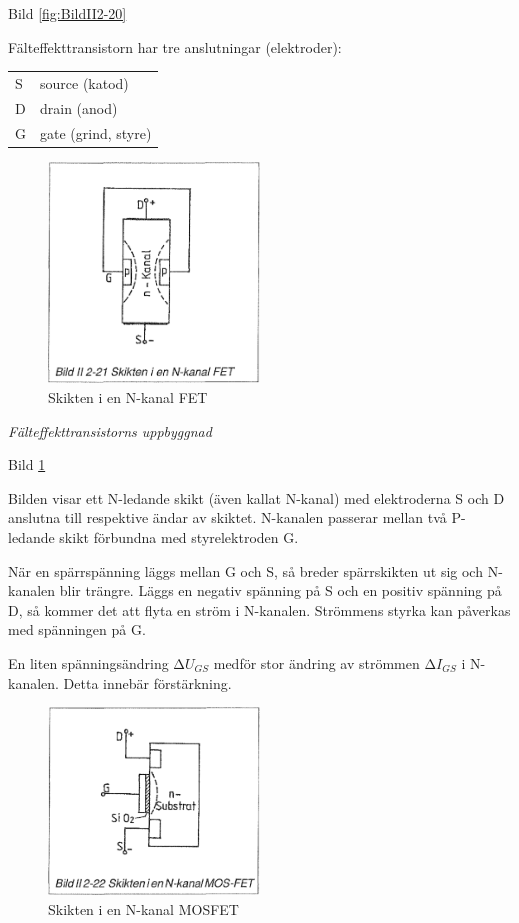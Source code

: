 Bild \ref{fig:BildII2-20}

Fälteffekttransistorn har tre anslutningar (elektroder):

\begin{tabular}{ll}
  S & source (katod) \\
  D & drain (anod) \\
  G & gate (grind, styre) \\
\end{tabular}

\begin{figure}
\includegraphics[width=0.5\textwidth]{images/bild_2_2-21}
\caption{Skikten i en N-kanal FET}
\label{fig:BildII2-21}
\end{figure}

\emph{Fälteffekttransistorns uppbyggnad}

Bild \ref{fig:BildII2-21}

Bilden visar ett N-ledande skikt (även kallat N-kanal) med elektroderna S och D
anslutna till respektive ändar av skiktet. N-kanalen passerar mellan två
P-ledande skikt förbundna med styrelektroden G.

När en spärrspänning läggs mellan G och S, så breder spärrskikten ut sig och
N-kanalen blir trängre. Läggs en negativ spänning på S och en positiv spänning
på D, så kommer det att flyta en ström i N-kanalen. Strömmens styrka kan
påverkas med spänningen på G.

En liten spänningsändring \(∆U_{GS}\) medför stor ändring av strömmen
\(∆I_{GS}\) i N-kanalen. Detta innebär förstärkning.

\begin{figure}
\includegraphics[width=0.5\textwidth]{images/bild_2_2-22}
\caption{Skikten i en N-kanal MOSFET}
\label{fig:BildII2-22}
\end{figure}


